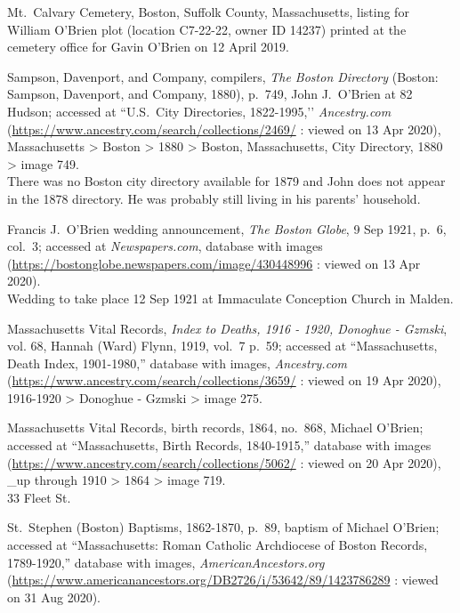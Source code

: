 \begin{thebibliography}{999}
Mt.\ Calvary Cemetery, Boston, Suffolk County, Massachusetts, listing for William O'Brien plot (location C7-22-22, owner ID 14237) printed at the cemetery office for Gavin O'Brien on 12 April 2019.

Sampson, Davenport, and Company, compilers, \textit{The Boston Directory} (Boston: Sampson, Davenport, and Company, 1880), p.\ 749, John J.\ O'Brien at 82 Hudson; accessed at ``U.S.\ City Directories, 1822-1995,’’ \textit{Ancestry.com} (\url{https://www.ancestry.com/search/collections/2469/} : viewed on 13 Apr 2020), Massachusetts > Boston > 1880 > Boston, Massachusetts, City Directory, 1880 > image 749.\\
There was no Boston city directory available for 1879 and John does not appear in the 1878 directory. He was probably still living in his parents' household.

Francis J.\ O'Brien wedding announcement, \textit{The Boston Globe}, 9 Sep 1921, p.\ 6, col.\ 3; accessed at \textit{Newspapers.com}, database with images (\url{https://bostonglobe.newspapers.com/image/430448996} : viewed on 13 Apr 2020).\\
Wedding to take place 12 Sep 1921 at Immaculate Conception Church in Malden.

Massachusetts Vital Records, \textit{Index to Deaths, 1916 - 1920, Donoghue - Gzmski}, vol. 68, Hannah (Ward) Flynn, 1919, vol.\ 7 p.\ 59; accessed at ``Massachusetts, Death Index, 1901-1980,'' database with images, \textit{Ancestry.com} (\url{https://www.ancestry.com/search/collections/3659/} : viewed on 19 Apr 2020), 1916-1920 > Donoghue - Gzmski > image 275.

Massachusetts Vital Records, birth records, 1864, no.\ 868, Michael O'Brien; accessed at ``Massachusetts, Birth Records, 1840-1915,'' database with images (\url{https://www.ancestry.com/search/collections/5062/} : viewed on 20 Apr 2020), \_up through 1910 > 1864 > image 719.\\
33 Fleet St.

St.\ Stephen (Boston) Baptisms, 1862-1870, p.\ 89, baptism of Michael O'Brien; accessed at ``Massachusetts: Roman Catholic Archdiocese of Boston Records, 1789-1920,'' database with images, \textit{AmericanAncestors.org} (\url{https://www.americanancestors.org/DB2726/i/53642/89/1423786289} : viewed on 31 Aug 2020).


\end{thebibliography}
